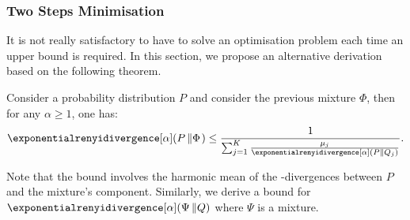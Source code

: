 \subsubsection{Two Steps Minimisation}
It is not really satisfactory to have to solve an optimisation problem each time an upper bound is required.
In this section, we propose an alternative derivation based on the following theorem.

\begin{thm}
\label{th:mix_phi}
    Consider a probability distribution $P$ and consider the previous mixture $\Phi$, then for any $\alpha\geq1$, one has:
    \begin{align*}
        \exponentialrenyidivergence[\alpha](P\left\Vert\Phi\right.) \leq     \frac{1}{\sum_{j=1}^K\frac{\mu_j}{\exponentialrenyidivergence[\alpha]( P \Vert Q_j)}}.
    \end{align*}
\end{thm}

Note that the bound involves the harmonic mean of the \Renyi-divergences between $P$ and the mixture's component. 
Similarly, we derive a bound for $\exponentialrenyidivergence[\alpha](\Psi\left\Vert Q\right)$ where $\Psi$ is a mixture.

